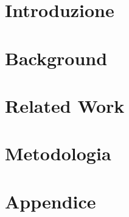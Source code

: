 \documentclass[14pt]{extreport}
\begin{document}




\chapter{Introduzione}
\setcounter{page}{1} 		


\chapter{Background}


\chapter{Related Work}


\chapter{Metodologia}









\chapter*{Appendice}
\label{ch:appendix}
\setlength{\headheight}{17pt}
\rhead{}
\fancyhead[L]{\rightmark}
\cfoot{\thepage}



\listoffigures %
\listoftables %
\end{document}
